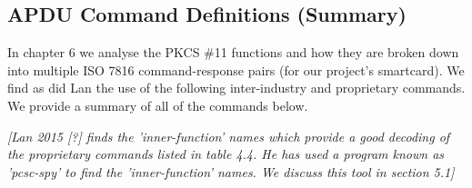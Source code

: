 \documentclass[bsc,frontabs,twoside,singlespacing,parskip,deptreport]{infthesis}     %
\begin{document}
\pagebreak
\subsection{APDU Command Definitions (Summary)}


In chapter 6 we analyse the PKCS \#11 functions and how they are broken down into multiple ISO 7816 command-response pairs (for our project's smartcard). We find as did Lan the use of the following inter-industry and proprietary commands. We provide a summary of all of the commands below.

\textit{[Lan 2015 [?] finds the 'inner-function' names which provide a good decoding of the proprietary commands listed in table 4.4. He has used a program known as 'pcsc-spy' to find the 'inner-function' names. We discuss this tool in section 5.1]}
\end{document}
